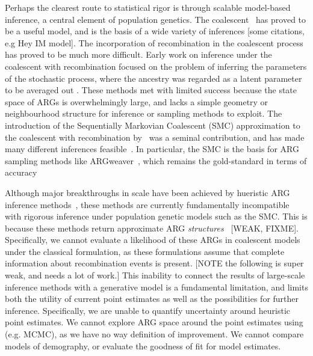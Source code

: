 \documentclass{article}
\begin{document}
Perhaps the clearest route to statistical rigor is through scalable
model-based inference, a central element of population genetics.
The coalescent~\citep{kingman_genealogy_1982,kingman_coalescent_1982,hudson_testing_1983,
tajima_evolutionary_1983} has proved to be a useful model, and is the
basis of a wide variety of inferences [some citations, e.g Hey IM model]. 
The incorporation
of recombination in the coalescent process~\citep{hudson_properties_1983}
has proved to be much more difficult.
Early work on inference under the coalescent with recombination
focused on the problem of
inferring the parameters of the
stochastic process, where the ancestry was regarded as a
latent parameter to be averaged out
\citep[e.g.][]{griffiths_ancestral_1996,kuhner_maximum_2000,
nielsen_estimation_2000,
fearnhead_estimating_2001}.
These methods met with limited success
because the state space of ARGs is overwhelmingly large, and
lacks a simple geometry or neighbourhood structure for inference or
sampling methods to  exploit.
The introduction of the Sequentially Markovian Coalescent (SMC)
approximation to the coalescent with recombination
by~\cite{mcvean_approximating_2005} was a seminal contribution,
and has made many different inferences
feasible~\citep[e.g.]{li_inference_2011,paul_accurate_2011,schiffels_inferring_2014}.
In particular, the SMC is the basis for ARG sampling methods
like ARGweaver~\citep{rasmussen_genome-wide_2014}, which remains the
gold-standard in terms of accuracy~\citep{brandt2022evaluation}

Although major breakthroughs in scale have been achieved by hueristic
ARG inference
methods~\citep{kelleher_inferring_2019,speidel_method_2019,zhang_biobank-scale_2023},
these methods are currently fundamentally incompatible with rigorous
inference under population genetic models such as the SMC. This is 
because these methods return approximate ARG
\emph{structures}~\citep{wong_general_2023} [WEAK, FIXME]. Specifically,
we cannot evaluate a likelihood of these ARGs in coalescent 
models under the classical 
\cite{kuhner_maximum_2000} formulation, as these formulations assume
that complete information about recombination events is present.
[NOTE the following is super weak, and needs a lot of work.]
This inability to connect the results of large-scale inference methods
with a generative model
is a fundamental limitation, and limits both the utility of 
current point estimates as well as the possibilities for further
inference. Specifically, we are unable to quantify uncertainty 
around heuristic point estimates. We cannot explore ARG space
around the point estimates using (e.g. MCMC), as we have no way definition
of improvement. We cannot compare models of demography, or evaluate the 
goodness of fit for model estimates.
\end{document}
